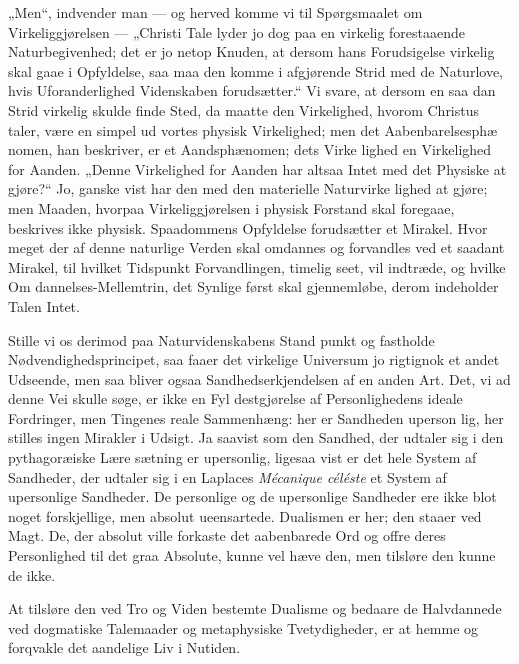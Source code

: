 \documentclass[12pt]{book}
\newcommand{\opage}[1]{\marginnote{\footnotesize\textit{[#1]}}}
\begin{document}
„Men“, indvender man --- og herved komme vi til
Spørgsmaalet om Virkeliggjørelsen --- „Christi Tale lyder
jo dog paa en virkelig forestaaende Naturbegivenhed;
det er jo netop Knuden, at dersom hans Forudsigelse
virkelig skal gaae i Opfyldelse, saa maa den komme i
afgjørende Strid med de Naturlove, hvis Uforanderlighed
Videnskaben forudsætter.“ Vi svare, at dersom en saa\-%
dan Strid virkelig skulde finde Sted, da maatte den
Virkelighed, hvorom Christus taler, være en simpel ud\-%
vortes physisk Virkelighed; men det Aabenbarelsesphæ\-%
nomen, han beskriver, er et Aandsphænomen; dets Virke\-%
\opage{207}\setcounter{footnote}{0}%
lighed en Virkelighed for Aanden. „Denne Virkelighed
for Aanden har altsaa Intet med det Physiske at gjøre?“
Jo, ganske vist har den med den materielle Naturvirke\-%
lighed at gjøre; men Maaden, hvorpaa Virkeliggjørelsen
i physisk Forstand skal foregaae, beskrives ikke physisk.
Spaadommens Opfyldelse forudsætter et Mirakel. Hvor\-%
meget der af denne naturlige Verden skal omdannes og
forvandles ved et saadant Mirakel, til hvilket Tidspunkt
Forvandlingen, timelig seet, vil indtræde, og hvilke Om\-%
dannelses-Mellemtrin, det Synlige først skal gjennemløbe,
derom indeholder Talen Intet.

Stille vi os derimod paa Naturvidenskabens Stand\-%
punkt og fastholde Nødvendighedsprincipet, saa faaer det
virkelige Universum jo rigtignok et andet Udseende,
men saa bliver ogsaa Sandhedserkjendelsen af en anden
Art. Det, vi ad denne Vei skulle søge, er ikke en Fyl\-%
destgjørelse af Personlighedens ideale Fordringer, men
Tingenes reale Sammenhæng: her er Sandheden uperson\-%
lig, her stilles ingen Mirakler i Udsigt. Ja saavist som
den Sandhed, der udtaler sig i den pythagoræiske Lære\-%
sætning er upersonlig, ligesaa vist er det hele System af
Sandheder, der udtaler sig i en Laplaces \textit{Mécanique céléste}
et System af upersonlige Sandheder. De personlige og
de upersonlige Sandheder ere ikke blot noget forskjellige,
men absolut ueensartede. Dualismen er her; den staaer
ved Magt. De, der absolut ville forkaste det aabenbarede
Ord og offre deres Personlighed til det graa Absolute,
kunne vel hæve den, men tilsløre den kunne de ikke.

At tilsløre den ved Tro og Viden bestemte Dualisme
og bedaare de Halvdannede ved dogmatiske Talemaader
og metaphysiske Tvetydigheder, er at hemme og forqvakle
det aandelige Liv i Nutiden.
\end{document}
